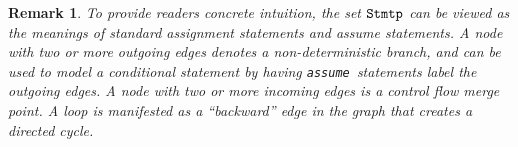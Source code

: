 \documentclass[preprint]{sig-alternate-05-2015}
\newtheorem{remark}{Remark}
\def\Stmtp{{\tt{Stmtp}}}
\def\assume{{\tt{assume}}}
\def\Sig{{\Sigma}}
\def\V{{\tt{Vars}}}
\def\iteif{{\mathit{if}}}
\def\itethen{{\mathit{then}}}
\def\iteelse{{\mathit{else}}}
\def\itefi{{\mathit{if}}}
\begin{document}
\begin{remark}
To provide readers concrete intuition, the set $\Stmtp$ can be viewed
as the meanings of standard {\em{assignment}} statements and
{\em{assume}} statements.
A node with two or more outgoing edges denotes a {\em{non-deterministic}}
branch, and can be used to model a conditional statement by having
\assume\ statements label the outgoing edges.
A node with two or more incoming edges is a control flow merge point.
A loop is manifested as a ``backward'' edge in the graph that creates
a directed cycle.
\end{remark}
\end{document}
